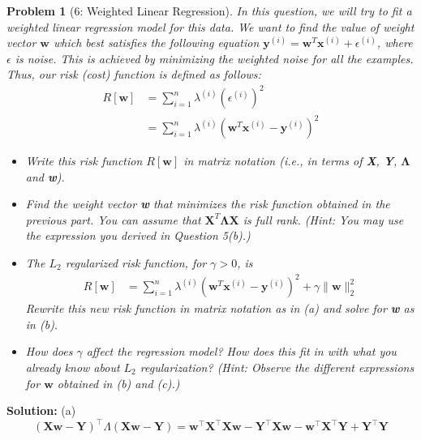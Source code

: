 \documentclass[11pt]{exam}
\theoremstyle{quest}
\newtheorem*{question}{Problem}
\begin{document}
\begin{question}[6: Weighted Linear Regression]
In this question, we will try to fit a weighted linear regression model for this
data. We want to find the value of weight vector $\textbf{w}$ which best
satisfies the following equation
$\textbf{y}^{(i)}=\textbf{w}^T\textbf{x}^{(i)}+\epsilon^{(i)}$, where $\epsilon$
is noise. This is achieved by minimizing the weighted noise for all the
examples. Thus, our risk (cost) function is defined as follows:
\begin{align*}
  R[\textbf{w}] &= \sum_{i=1}^{n} \lambda^{(i)}(\epsilon^{(i)})^2\\
                &= \sum_{i=1}^{n} \lambda^{(i)}(\textbf{w}^T\textbf{x}^{(i)}-\textbf{y}^{(i)})^2
\end{align*}
\begin{itemize}
\item[(a)] Write this risk function $R[\textbf{w}]$ in matrix notation (i.e., in
  terms of \textbf{X}, \textbf{Y}, $\boldsymbol{\Lambda}$ and \textbf{w}).
\item[(b)] Find the weight vector \textbf{w} that minimizes the risk function
  obtained in the previous part. You can assume that
  $\textbf{X}^T\boldsymbol{\Lambda}\textbf{X}$ is full rank. (Hint: You may use
  the expression you derived in Question 5(b).)
\medskip
\item[(c)] The $L_2$ regularized risk function, for $\gamma>0$, is
  \begin{align*}
    R[\textbf{w}] &= \sum_{i=1}^{n} \lambda^{(i)}(\textbf{w}^T\textbf{x}^{(i)}-\textbf{y}^{(i)})^2 + \gamma \|\textbf{w}\|^2_2
  \end{align*}
  Rewrite this new risk function in matrix notation as in (a) and solve for
  \textbf{w} as in (b).
\item[(d)] How does $\gamma$ affect the regression model? How does this fit in
  with what you already know about $L_2$ regularization? (Hint: Observe
  the different expressions for $\textbf{w}$ obtained in (b) and (c).)
\end{itemize}
\end{question}
\textbf{Solution:}
(a) \[
(\textbf{Xw} - \textbf{Y})^\top \Lambda (\textbf{Xw} - \textbf{Y}) = \textbf{w}^\top \textbf{X}^\top \textbf{Xw} - \textbf{Y}^\top \textbf{Xw} -\textbf{w}^\top \textbf{X}^\top \textbf{Y} + \textbf{Y}^\top \textbf{Y}
\]
\end{document}
